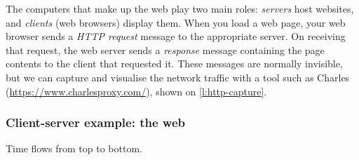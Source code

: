 \begin{frame}[plain]
    \label{s:website}
\end{frame}

The computers that make up the web play two main roles: \emph{servers} host websites, and \emph{clients} (web browsers) display them.
When you load a web page, your web browser sends a \emph{HTTP request} message to the appropriate server.
On receiving that request, the web server sends a \emph{response} message containing the page contents to the client that requested it.
These messages are normally invisible, but we can capture and visualise the network traffic with a tool such as Charles (\url{https://www.charlesproxy.com/}), shown on \autoref{l:http-capture}.

\begin{frame}
    \label{s:client-server}
    \frametitle{Client-server example: the web}
    Time flows from top to bottom.
    \begin{center}
    \end{center}
\end{frame}

